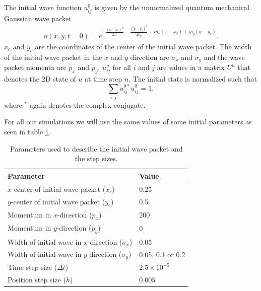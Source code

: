 \documentclass[english,notitlepage,reprint,nofootinbib]{revtex4-1}  %
\begin{document}
The initial wave function $u_{ij}^0$ is given by the unnormalized quantum mechanical Gaussian wave packet
\begin{align}
    u(x,y,t = 0) = e^{-\frac{(x-x_c)^2}{2 \sigma_x^2} -\frac{(y-y_c)^2}{2 \sigma_y^2}+ ip_x (x-x_c)+ ip_y (y-y_c)}. \label{eq:wave_func}
\end{align}
$x_c$ and $y_c$ are the coordinates of the center of the initial wave packet. The width of the initial wave packet in the $x$ and $y$ direction are $\sigma_x$ and $\sigma_y$ and the wave packet momenta are $p_x$ and $p_y$. $u_{ij}^n$ for all $i$ and $j$ are values in a matrix $U^n$ that denotes the 2D state of $u$ at time step $n$. The initial state is normalized such that
\begin{equation}
    \sum_{i,j} u_{ij}^{0*} u_{ij}^0 = 1,
\end{equation}
where $^*$ again denotes the complex conjugate.

For all our simulations we will use the same values of some initial parameters as seen in table \ref{tab:parameters}.
\begin{table}[H]
    \begin{small}
        \caption{Parameters used to describe the initial wave packet and the step sizes.}
        \label{tab:parameters}
        \begin{center}
            \begin{tabular}{|l|l|}
                \hline
                \textbf{Parameter}                                  & \textbf{Value}      \\
                \hline
                $x$-center of initial wave packet ($x_c$)           & 0.25                \\
                \hline
                $y$-center of initial wave packet ($y_c$)           & 0.5                 \\
                \hline

                Momentum in $x$-direction ($p_x$)                   & 200                 \\
                \hline
                Momentum in $y$-direction ($p_y$)                   & 0                   \\
                \hline
                Width of initial wave in $x$-direction ($\sigma_x$) & 0.05                \\
                \hline
                Width of initial wave in $y$-direction ($\sigma_y$) & 0.05, 0.1 or 0.2    \\
                \hline
                Time step size ($\Delta t$)                         & $2.5\times 10^{-5}$ \\
                \hline
                Position step size ($h$)                            & $0.005$             \\
                \hline
            \end{tabular}
        \end{center}
    \end{small}
\end{table}
\end{document}

